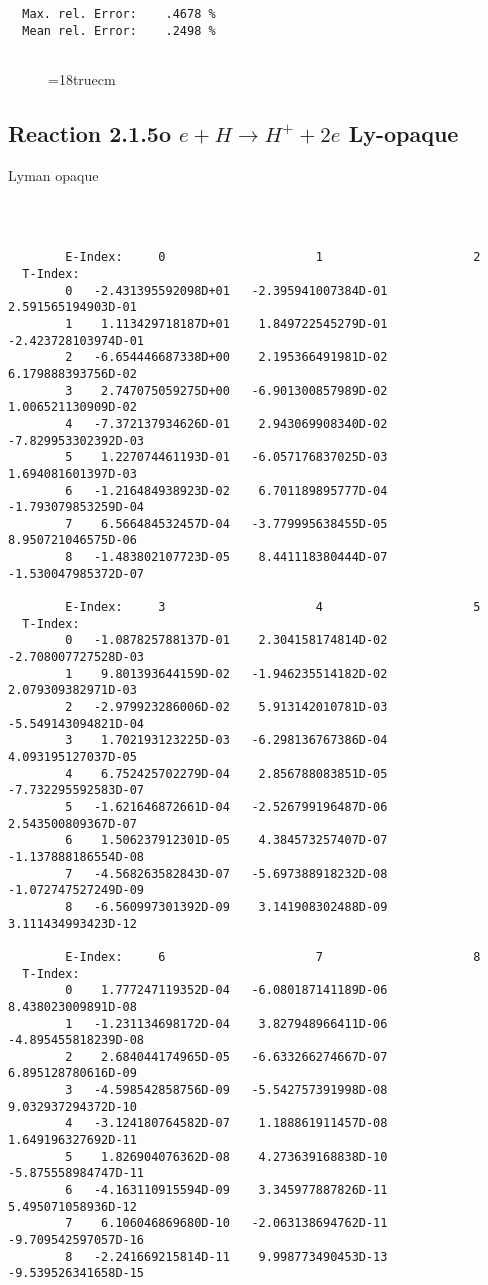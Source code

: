 \begin{verbatim}
  Max. rel. Error:    .4678 %
  Mean rel. Error:    .2498 %


\end{verbatim}
\begin{figure} \label{2.1.5i}
\epsfxsize=18truecm
\end{figure}
\newpage
\subsection{
Reaction 2.1.5o $ e + H \rightarrow H^+ + 2e $  Ly-opaque}


Lyman opaque


\begin{verbatim}



        E-Index:     0                     1                     2
  T-Index:
        0   -2.431395592098D+01   -2.395941007384D-01    2.591565194903D-01
        1    1.113429718187D+01    1.849722545279D-01   -2.423728103974D-01
        2   -6.654446687338D+00    2.195366491981D-02    6.179888393756D-02
        3    2.747075059275D+00   -6.901300857989D-02    1.006521130909D-02
        4   -7.372137934626D-01    2.943069908340D-02   -7.829953302392D-03
        5    1.227074461193D-01   -6.057176837025D-03    1.694081601397D-03
        6   -1.216484938923D-02    6.701189895777D-04   -1.793079853259D-04
        7    6.566484532457D-04   -3.779995638455D-05    8.950721046575D-06
        8   -1.483802107723D-05    8.441118380444D-07   -1.530047985372D-07

        E-Index:     3                     4                     5
  T-Index:
        0   -1.087825788137D-01    2.304158174814D-02   -2.708007727528D-03
        1    9.801393644159D-02   -1.946235514182D-02    2.079309382971D-03
        2   -2.979923286006D-02    5.913142010781D-03   -5.549143094821D-04
        3    1.702193123225D-03   -6.298136767386D-04    4.093195127037D-05
        4    6.752425702279D-04    2.856788083851D-05   -7.732295592583D-07
        5   -1.621646872661D-04   -2.526799196487D-06    2.543500809367D-07
        6    1.506237912301D-05    4.384573257407D-07   -1.137888186554D-08
        7   -4.568263582843D-07   -5.697388918232D-08   -1.072747527249D-09
        8   -6.560997301392D-09    3.141908302488D-09    3.111434993423D-12

        E-Index:     6                     7                     8
  T-Index:
        0    1.777247119352D-04   -6.080187141189D-06    8.438023009891D-08
        1   -1.231134698172D-04    3.827948966411D-06   -4.895455818239D-08
        2    2.684044174965D-05   -6.633266274667D-07    6.895128780616D-09
        3   -4.598542858756D-09   -5.542757391998D-08    9.032937294372D-10
        4   -3.124180764582D-07    1.188861911457D-08    1.649196327692D-11
        5    1.826904076362D-08    4.273639168838D-10   -5.875558984747D-11
        6   -4.163110915594D-09    3.345977887826D-11    5.495071058936D-12
        7    6.106046869680D-10   -2.063138694762D-11   -9.709542597057D-16
        8   -2.241669215814D-11    9.998773490453D-13   -9.539526341658D-15


\end{verbatim}
